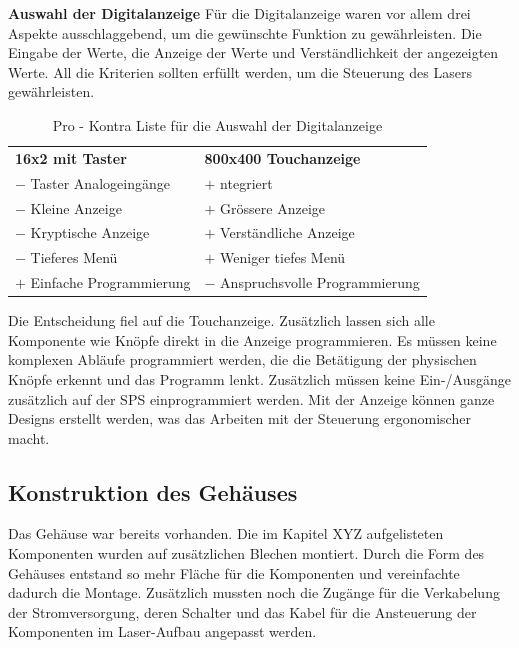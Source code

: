 \textbf{Auswahl der Digitalanzeige}
Für die Digitalanzeige waren vor allem drei Aspekte ausschlaggebend, um die gewünschte Funktion zu gewährleisten. Die Eingabe der Werte, die Anzeige der Werte und Verständlichkeit der angezeigten Werte. All die Kriterien sollten erfüllt werden, um die Steuerung des Lasers gewährleisten.

\begin{table}[H]
    \centering
    \begin{tabular}{l|l}
        \textbf{16x2 mit Taster}&       \textbf{800x400 Touchanzeige}\\
        $-$ Taster Analogeingänge&      $+$ ntegriert\\
        $-$ Kleine Anzeige&             $+$ Grössere Anzeige\\
        $-$ Kryptische Anzeige&         $+$ Verständliche Anzeige\\
        $-$ Tieferes Menü&              $+$ Weniger tiefes Menü\\
        $+$ Einfache Programmierung&    $-$ Anspruchsvolle Programmierung\\
    \end{tabular}
    \caption{Pro - Kontra Liste für die Auswahl der Digitalanzeige}
    \label{tab:choice_display}
\end{table}

Die Entscheidung fiel auf die Touchanzeige. Zusätzlich lassen sich alle Komponente wie Knöpfe direkt in die Anzeige programmieren. Es müssen keine komplexen Abläufe programmiert werden, die die Betätigung der physischen Knöpfe erkennt und das Programm lenkt. Zusätzlich müssen keine Ein-/Ausgänge zusätzlich auf der SPS einprogrammiert werden. Mit der Anzeige können ganze Designs erstellt werden, was das Arbeiten mit der Steuerung ergonomischer macht.  

\subsection{Konstruktion des Gehäuses}
Das Gehäuse war bereits vorhanden. Die im Kapitel XYZ aufgelisteten Komponenten wurden auf zusätzlichen Blechen montiert. Durch die Form des Gehäuses entstand so mehr Fläche für die Komponenten und vereinfachte dadurch die Montage. Zusätzlich mussten noch die Zugänge für die Verkabelung der Stromversorgung, deren Schalter und das Kabel für die Ansteuerung der Komponenten im Laser-Aufbau angepasst werden.

